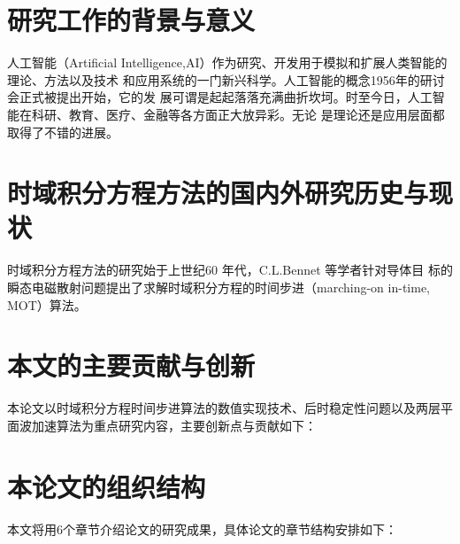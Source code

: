 \documentclass{standalone}
\begin{document}
\thesischapterexordium

\section{研究工作的背景与意义}
人工智能（Artificial Intelligence,AI）作为研究、开发用于模拟和扩展人类智能的理论、方法以及技术
和应用系统的一门新兴科学。人工智能的概念1956年的研讨会正式被提出开始，它的发
展可谓是起起落落充满曲折坎坷。时至今日，人工智能在科研、教育、医疗、金融等各方面正大放异彩。无论
是理论还是应用层面都取得了不错的进展。


\section{时域积分方程方法的国内外研究历史与现状}
时域积分方程方法的研究始于上世纪60 年代，C.L.Bennet 等学者针对导体目
标的瞬态电磁散射问题提出了求解时域积分方程的时间步进（marching-on in-time,
MOT）算法。

\section{本文的主要贡献与创新}
本论文以时域积分方程时间步进算法的数值实现技术、后时稳定性问题以及两层平面波加速算法为重点研究内容，主要创新点与贡献如下：

\section{本论文的组织结构}
本文将用6个章节介绍论文的研究成果，具体论文的章节结构安排如下：
\end{document}
